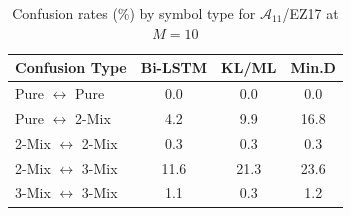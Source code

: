 
\begin{table}[h]
\caption{Confusion rates (\%) by symbol type for $\mathcal{A}_{11}$/EZ17 at $M=10$}
\centering
\begin{tabular}{l|ccc}
\toprule
\textbf{Confusion Type} & \textbf{Bi-LSTM} & \textbf{KL/ML} & \textbf{Min.D} \\
\midrule
Pure $\leftrightarrow$ Pure & 0.0 & 0.0 & 0.0 \\
Pure $\leftrightarrow$ 2-Mix & 4.2 & 9.9 & 16.8 \\
2-Mix $\leftrightarrow$ 2-Mix & 0.3 & 0.3 & 0.3 \\
2-Mix $\leftrightarrow$ 3-Mix & 11.6 & 21.3 & 23.6 \\
3-Mix $\leftrightarrow$ 3-Mix & 1.1 & 0.3 & 1.2 \\
\bottomrule
\end{tabular}
\label{Table:ConfusionByType}
\end{table}
